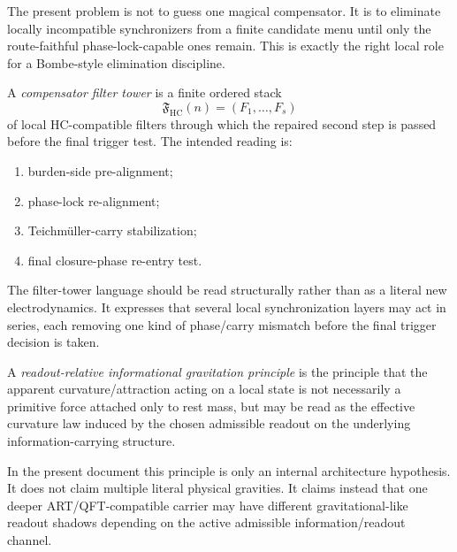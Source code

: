 \begin{remark}
\label{rem:why-the-bombe-idea-fits-here}
The present problem is not to guess one magical compensator. It is to eliminate locally incompatible synchronizers from a finite candidate menu until only the route-faithful phase-lock-capable ones remain. This is exactly the right local role for a Bombe-style elimination discipline.
\end{remark}

\begin{definition}
\label{def:compensator-filter-tower}
A \emph{compensator filter tower} is a finite ordered stack
\[
  \mathfrak F_{\mathrm{HC}}(n)=
  (F_1,\dots,F_s)
\]
of local HC-compatible filters through which the repaired second step is passed before the final trigger test. The intended reading is:
\begin{enumerate}[leftmargin=2em,label=(\roman*)]
  \item burden-side pre-alignment;
  \item phase-lock re-alignment;
  \item Teichm\"uller-carry stabilization;
  \item final closure-phase re-entry test.
\end{enumerate}
\end{definition}

\begin{remark}
\label{rem:filter-tower-and-electromagnetic-analogy}
The filter-tower language should be read structurally rather than as a literal new electrodynamics. It expresses that several local synchronization layers may act in series, each removing one kind of phase/carry mismatch before the final trigger decision is taken.
\end{remark}

\begin{definition}
\label{def:readout-relative-informational-gravitation-principle}
A \emph{readout-relative informational gravitation principle} is the principle that the apparent curvature/attraction acting on a local state is not necessarily a primitive force attached only to rest mass, but may be read as the effective curvature law induced by the chosen admissible readout on the underlying information-carrying structure.
\end{definition}

\begin{remark}
\label{rem:how-far-this-principle-should-be-claimed}
In the present document this principle is only an internal architecture hypothesis. It does not claim multiple literal physical gravities. It claims instead that one deeper ART/QFT-compatible carrier may have different gravitational-like readout shadows depending on the active admissible information/readout channel.
\end{remark}

